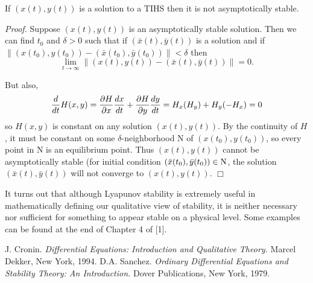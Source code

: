 \documentclass[12pt]{article}
\def\pf{{\em Proof. }}
\def\bx{\bar{x}}
\def\by{\bar{y}}
\begin{document}
\begin{thm}
	If $(x(t), y(t))$ is a solution to a TIHS then it is not
asymptotically stable.
\end{thm}

\pf Suppose $(x(t),y(t))$ is an asymptotically stable solution.  Then
we can find $t_0$ and $\delta > 0$ such that if $(\bx(t), \by(t))$ is
a solution and if $\| (x(t_0),y(t_0)) - (\bx(t_0), \by(t_0)) \| < \delta$ then
$$\lim_{t \rightarrow \infty} \| (x(t),y(t)) - (\bx(t), \by(t)) \| =
0.$$

But also, 
$${d \over dt} H(x,y) = {\partial H \over \partial x}{dx \over dt} +
{\partial H \over \partial y}{dy \over dt} = H_x (H_y) + H_y (-H_x) =
0$$
so $H(x,y)$ is constant on any solution $(x(t),y(t))$.  By the continuity of $H$,
it must be constant on some $\delta$-neighborhood N of
$(x(t_0),y(t_0))$, so every point in N is an equilibrium point.  Thus
$(x(t),y(t))$ cannot be asymptotically stable (for initial condition
$(\bx(t_0),\by(t_0)) \in {\rm N}$, the solution
$(\bx(t),\by(t))$ will not converge to $(x(t),y(t))$. $\Box$

It turns out that although Lyapunov stability is extremely useful in
mathematically defining our qualitative view of stability, it is
neither necessary nor sufficient for something to appear stable on a
physical level.  Some examples can be found at the end of Chapter 4 of [1].

\begin{thebibliography}{99}
 J. Cronin. {\em Differential Equations: Introduction
and Qualitative Theory.} Marcel Dekker, New York, 1994.
 D.A. Sanchez. {\em Ordinary Differential Equations
and Stability Theory: An Introduction.}  Dover Publications, New York,
1979.
\end{thebibliography}
\end{document}
